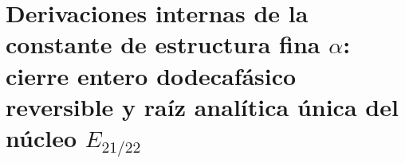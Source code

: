 \chapter{Derivaciones internas de la constante de estructura fina \(\alpha\): cierre entero dodecafásico reversible y raíz analítica única del núcleo \(E_{21/22}\)}
\label{chap:p3-final:31:dos_derivaciones_alpha}



